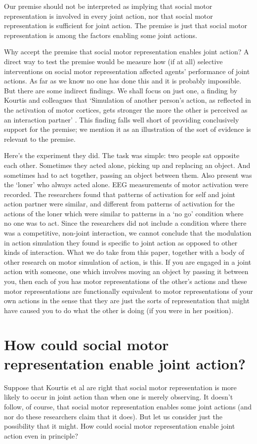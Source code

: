 \documentclass[12pt,\papersize]{extarticle}
\begin{document}
Our premise should not be interpreted as implying that social motor representation is involved in every joint action,
nor that social motor representation is sufficient for joint action.
The premise is just that social motor representation is among the factors enabling some joint actions.

Why accept the premise that social motor representation enables joint action?
A direct way to test the premise would be
measure how (if at all) selective interventions on social motor representation affected agents’ performance of joint actions.
As far as we know no one has done this and it is probably impossible.
But there are some indirect findings.
We shall focus on just one, a finding by Kourtis and colleagues that `Simulation of another person’s action, as reﬂected in the activation of motor cortices, gets stronger the more the other is perceived as an interaction partner’  \citep[p.\ 4]{kourtis:2010_favoritism}.
This finding falls well short of providing conclusively support for the premise; we mention it as an illustration of the sort of evidence is relevant to the premise.

Here’s the experiment they did.
The task was simple: two people sat opposite each other.  Sometimes they acted alone, picking up and replacing an object.  And sometimes had to act together, passing an object between them.  Also present was the ‘loner’ who always acted alone.
EEG measurements of motor activation were recorded.
The researchers found that patterns of activation for self and joint action partner were similar, and different from patterns of activation for the actions of the loner which were similar to patterns in a ‘no go’ condition where no one was to act.
Since the researchers did not include a condition where there was a competitive, non-joint interaction, we cannot conclude that the modulation in action simulation they found is specific to joint action as opposed to other kinds of interaction.
What we do take from this paper,
together with a body of other research on motor simulation of action,
is this.
If you are engaged in a joint action with someone, one which involves moving an object by passing it between you, then each of you has motor representations of the other’s actions and these motor representations are functionally equivalent to motor representations of your own actions in the sense that they are just the sorts of representation that might have caused you to do what the other is doing (if you were in her position).


\section{How could social motor representation enable joint action?}
Suppose that Kourtis et al are right that social motor representation is more likely to occur in joint action than when one is merely observing.
It doesn't follow, of course, that social motor representation enables some joint actions (and nor do these researchers claim that it does).
But let us consider just the possibility that it might.
How could social motor representation enable joint action even in principle?
\end{document}
